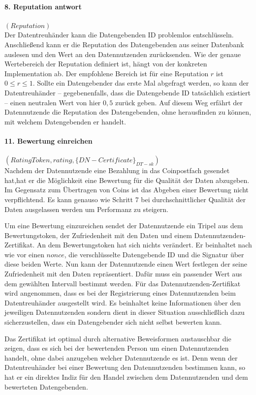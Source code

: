 \documentclass[
	fontsize=12pt,
	headings=small,
	parskip=half,           %
	bibliography=totoc,
	numbers=noenddot,       %
	open=any,               %
]{scrreprt}
\begin{document}
\paragraph{8. Reputation antwort}$(Reputation)$\\
Der Datentreuhänder kann die Datengebenden ID problemlos entschlüsseln. Anschließend kann er die Reputation des Datengebenden aus seiner Datenbank auslesen und den Wert an den Datennutzenden zurücksenden. Wie der genaue Wertebereich der Reputation definiert ist, hängt von der konkreten Implementation ab. Der empfohlene Bereich ist für eine Reputation $r$ ist $0\leq r\leq 1$. Sollte ein Datengebender das erste Mal abgefragt werden, so kann der Datentreuhänder -- gegebenenfalls, dass die Datengebende ID tatsächlich existiert -- einen neutralen Wert von hier $0,5$ zurück geben. Auf diesem Weg erfährt der Datennutzende die Reputation des Datengebenden, ohne herausfinden zu können, mit welchem Datengebenden er handelt.

\paragraph{11. Bewertung einreichen}$(RatingToken, rating, {\{DN-Certificate\}}_{DT-sk})$\\
Nachdem der Datennutzende eine Bezahlung in das Coinpostfach gesendet hat,hat er die Möglichkeit eine Bewertung für die Qualität der Daten abzugeben. Im Gegensatz zum Übertragen von Coins ist das Abgeben einer Bewertung nicht verpflichtend. Es kann genauso wie Schritt 7 bei durchschnittlicher Qualität der Daten ausgelassen werden um Performanz zu steigern. 

Um eine Bewertung einzureichen sendet der Datennutzende ein Tripel aus dem Bewertungstoken, der Zufriedenheit mit den Daten und einem Datennutzenden-Zertifikat. An dem Bewertungstoken hat sich nichts verändert. Er beinhaltet nach wie vor einen $nonce$, die verschlüsselte Datengebende ID und die Signatur über diese beiden Werte. Nun kann der Datennutzende einen Wert festlegen der seine Zufriedenheit mit den Daten repräsentiert. Dafür muss ein passender Wert aus dem gewählten Intervall bestimmt werden. Für das Datennutzenden-Zertifikat wird angenommen, dass es bei der Registrierung eines Datennutzenden beim Datentreuhänder ausgestellt wird. Es beinhaltet keine Informationen über den jeweiligen Datennutzenden sondern dient in dieser Situation ausschließlich dazu sicherzustellen, dass ein Datengebender sich nicht selbst bewerten kann. 

Das Zertifikat ist optimal durch alternative Beweisformen austauschbar die zeigen, dass es sich bei der bewertenden Person um einen Datennutzenden handelt, ohne dabei anzugeben welcher Datennutzende es ist. Denn wenn der Datentreuhänder bei einer Bewertung den Datennutzenden bestimmen kann, so hat er ein direktes Indiz für den Handel zwischen dem Datennutzenden und dem bewerteten Datengebenden.
\end{document}
